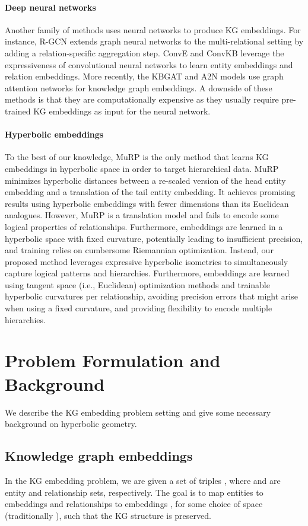 \documentclass[11pt,a4paper]{article}
\newcommand{\kg}{\textsc{KG}{}}
\begin{document}
\paragraph{Deep neural networks} 
Another family of methods uses neural networks to produce KG embeddings. 
For instance, R-GCN \cite{schlichtkrull2018modeling} extends graph neural networks to the multi-relational setting by adding a relation-specific aggregation step. 
ConvE and ConvKB \cite{dettmers2018convolutional,Nguyen2018} leverage the expressiveness of convolutional neural networks to learn entity embeddings and relation embeddings. 
More recently, the KBGAT \cite{KBGAT2019} and A2N \cite{bansal2019a2n} models use graph attention networks for knowledge graph embeddings. 
A downside of these methods is that they are computationally expensive as they usually require pre-trained KG embeddings as input for the neural network. 

\paragraph{Hyperbolic embeddings}
To the best of our knowledge, {MuRP} \cite{balavzevic2019multi} is the only method that learns KG embeddings in hyperbolic space in order to target hierarchical data. 
{MuRP} minimizes hyperbolic distances between a re-scaled version of the head entity embedding and a translation of the tail entity embedding. 
It achieves promising results using hyperbolic embeddings with fewer dimensions than its Euclidean analogues. 
However, {MuRP} is a translation model and fails to encode some logical properties of relationships.
Furthermore, embeddings are learned in a hyperbolic space with fixed curvature, potentially leading to insufficient precision, and training relies on cumbersome Riemannian optimization. 
Instead, our proposed method leverages expressive hyperbolic isometries to simultaneously capture logical patterns and hierarchies. 
Furthermore, embeddings are learned using tangent space (i.e., Euclidean) optimization methods and trainable hyperbolic curvatures per relationship, avoiding precision errors that might arise when using a fixed curvature, and providing flexibility to encode multiple hierarchies.  
\section{Problem Formulation and Background}
We describe the KG embedding problem setting and give some necessary background on hyperbolic geometry. 
\subsection{Knowledge graph embeddings}
In the KG embedding problem, we are given a set of triples , where  and  are entity and relationship sets,  respectively.
The goal is to map entities  to embeddings  and relationships  to embeddings , for some choice of space  (traditionally  ),
such that the \kg{} structure is preserved. 
\end{document}
